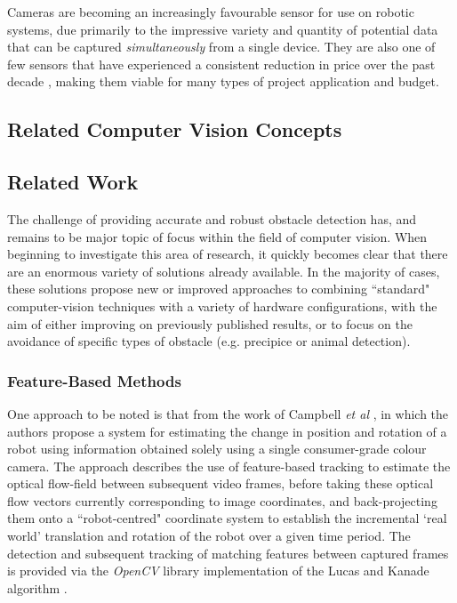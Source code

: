 Cameras are becoming an increasingly favourable sensor for use on robotic systems, due primarily to the impressive variety and quantity of potential data that can be captured \textit{simultaneously} from a single device. They are also one of few sensors that have experienced a consistent reduction in price over the past decade \cite{campbell}, making them viable for many types of project application and budget. 

\subsection{Related Computer Vision Concepts}

\subsection{Related Work}
\label{related-work}

The challenge of providing accurate and robust obstacle detection has, and remains to be major topic of focus within the field of computer vision. When beginning to investigate this area of research, it quickly becomes clear that there are an enormous variety of solutions already available. In the majority of cases, these solutions propose new or improved approaches to combining ``standard" computer-vision techniques with a variety of hardware configurations, with the aim of either improving on previously published results, or to focus on the avoidance of specific types of obstacle (e.g. precipice or animal detection). 


\subsubsection{Feature-Based Methods}

One approach to be noted is that from the work of Campbell \textit{et al} \cite{campbell}, in which the authors propose a system for estimating the change in position and rotation of a robot using information obtained solely using a single consumer-grade colour camera. The approach describes the use of feature-based tracking to estimate the optical flow-field between subsequent video frames, before taking these optical flow vectors currently corresponding to image coordinates, and back-projecting them onto a ``robot-centred" coordinate system to establish the incremental `real world' translation and rotation of the robot over a given time period. The detection and subsequent tracking of matching features between captured frames is provided via the \textit{OpenCV} library implementation of the Lucas and Kanade algorithm \cite{opencv-lucas-kanade-features}. 

